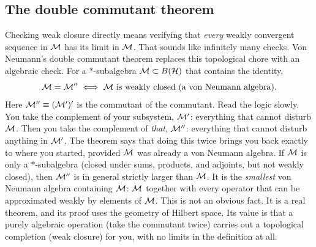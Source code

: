 \subsection*{The double commutant theorem}

Checking weak closure directly means verifying that \emph{every} weakly convergent sequence in $\mathcal{M}$ has its
limit in $\mathcal{M}$. That sounds like infinitely many checks. Von Neumann's double commutant theorem replaces this
topological chore with an algebraic check. For a $*$-subalgebra $\mathcal{M}\subset B(\mathcal{H})$ that contains the
identity,
\[
\mathcal{M} = \mathcal{M}'' \iff \mathcal{M} \text{ is weakly closed (a von Neumann algebra).}
\]
Here $\mathcal{M}''\equiv(\mathcal{M}')'$ is the commutant of the commutant. Read the logic slowly. You take the complement of
your subsystem, $\mathcal{M}'$: everything that cannot disturb $\mathcal{M}$. Then you take the complement of \emph{that},
$\mathcal{M}''$: everything that cannot disturb anything in $\mathcal{M}'$. The theorem says that doing this twice brings you
back exactly to where you started, provided $\mathcal{M}$ was already a von Neumann algebra. If $\mathcal{M}$ is only a
$*$-subalgebra (closed under sums, products, and adjoints, but not weakly closed), then $\mathcal{M}''$ is in general
strictly larger than $\mathcal{M}$. It is the \emph{smallest} von Neumann algebra containing $\mathcal{M}$: $\mathcal{M}$ together with
every operator that can be approximated weakly by elements of $\mathcal{M}$. This is not an obvious fact. It is a real
theorem, and its proof uses the geometry of Hilbert space. Its value is that a purely algebraic operation
(take the commutant twice) carries out a topological completion (weak closure) for you, with no limits in
the definition at all.

